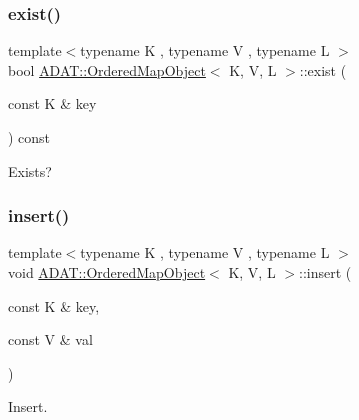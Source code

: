 \subsubsection{\texorpdfstring{exist()}{exist()}\hspace{0.1cm}{\footnotesize\ttfamily [2/2]}}
{\footnotesize\ttfamily template$<$typename K , typename V , typename L $>$ \\
bool \mbox{\hyperlink{classADAT_1_1OrderedMapObject}{A\+D\+A\+T\+::\+Ordered\+Map\+Object}}$<$ K, V, L $>$\+::exist (\begin{DoxyParamCaption}\item[{const K \&}]{key }\end{DoxyParamCaption}) const\hspace{0.3cm}{\ttfamily [inline]}}



Exists? 

\mbox{\label{classADAT_1_1OrderedMapObject_a6466cef0224cef7a1e943b32da6e3410}} 
\subsubsection{\texorpdfstring{insert()}{insert()}\hspace{0.1cm}{\footnotesize\ttfamily [1/2]}}
{\footnotesize\ttfamily template$<$typename K , typename V , typename L $>$ \\
void \mbox{\hyperlink{classADAT_1_1OrderedMapObject}{A\+D\+A\+T\+::\+Ordered\+Map\+Object}}$<$ K, V, L $>$\+::insert (\begin{DoxyParamCaption}\item[{const K \&}]{key,  }\item[{const V \&}]{val }\end{DoxyParamCaption})\hspace{0.3cm}{\ttfamily [inline]}}



Insert. 

